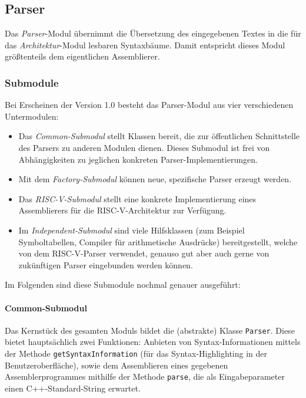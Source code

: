 \subsection{Parser}

Das \textit{Parser}-Modul übernimmt die Übersetzung des eingegebenen Textes in
die für das \textit{Architektur}-Modul lesbaren Syntaxbäume. Damit entspricht
dieses Modul größtenteils dem eigentlichen Assemblierer.

\subsubsection{Submodule}

Bei Erscheinen der Version 1.0 besteht das Parser-Modul aus vier verschiedenen
Untermodulen:

\begin{itemize}

\item Das \emph{Common-Submodul} stellt Klassen bereit, die zur öffentlichen
Schnittstelle des Parsers zu anderen Modulen dienen. Dieses Submodul ist frei
von Abhängigkeiten zu jeglichen konkreten Parser-Implementierungen.

\item Mit dem \emph{Factory-Submodul} können neue, spezifische Parser erzeugt
werden.

\item Das \emph{RISC-V-Submodul} stellt eine konkrete Implementierung eines
Assemblierers für die RISC-V-Architektur zur Verfügung.

\item Im \emph{Independent-Submodul} sind viele Hilfsklassen (zum Beispiel
Symboltabellen, Compiler für arithmetische Ausdrücke) bereitgestellt, welche von
dem RISC-V-Parser verwendet, genauso gut aber auch gerne von zukünftigen Parser
eingebunden werden können.

\end{itemize}

Im Folgenden sind diese Submodule nochmal genauer ausgeführt:

\paragraph{Common-Submodul}

Das Kernstück des gesamten Moduls bildet die (abstrakte) Klasse \texttt{Parser}.
Diese bietet hauptsächlich zwei Funktionen: Anbieten von Syntax-Informationen
mittels der Methode \texttt{getSyntaxInformation} (für das Syntax-Highlighting
in der Benutzeroberfläche), sowie dem Assemblieren eines gegebenen
Assemblerprogrammes mithilfe der Methode \texttt{parse}, die als
Eingabeparameter einen C++-Standard-String erwartet.

